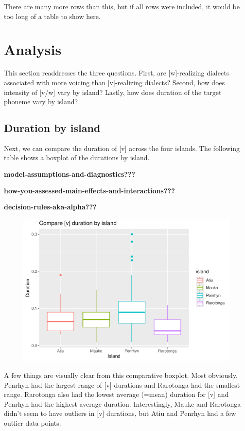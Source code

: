 \documentclass[
  ,man]{apa6}
\begin{document}
There are many more rows than this, but if all rows were included, it would be too long of a table to show here.

\section{Analysis}\label{analysis}

This section readdresses the three questions. First, are {[}w{]}-realizing dialects associated with more voicing than {[}v{]}-realizing dialects? Second, how does intensity of {[}v/w{]} vary by island? Lastly, how does duration of the target phoneme vary by island?

\subsection{Duration by island}\label{duration-by-island}

Next, we can compare the duration of {[}v{]} across the four islands. The following table shows a boxplot of the durations by island.

\textbf{model-assumptions-and-diagnostics???}

\textbf{how-you-assessed-main-effects-and-interactions???}

\textbf{decision-rules-aka-alpha???}

\begin{figure}
\includegraphics[width=1\linewidth]{cim_w_v_manuscript_files/figure-latex/duration-by-island-1} \caption{ }\label{fig:duration-by-island}
\end{figure}

A few things are visually clear from this comparative boxplot. Most obviously, Penrhyn had the largest range of {[}v{]} durations and Rarotonga had the smallest range. Rarotonga also had the lowest average (=mean) duration for {[}v{]} and Penrhyn had the highest average duration. Interestingly, Mauke and Rarotonga didn't seem to have outliers in {[}v{]} durations, but Atiu and Penrhyn had a few outlier data points.
\end{document}
